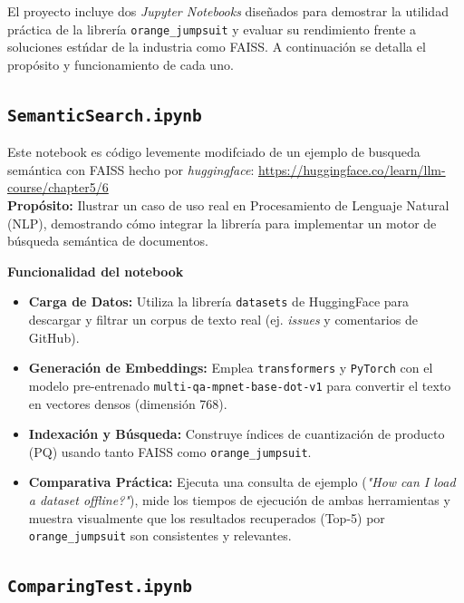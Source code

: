 El proyecto incluye dos \textit{Jupyter Notebooks} diseñados para demostrar 
la utilidad pr\'actica de la librer\'ia \texttt{orange\_jumpsuit} y evaluar
su rendimiento frente a soluciones est\'ndar de la industria como FAISS. 
A continuaci\'on se detalla el prop\'osito y funcionamiento de cada uno.

\subsection*{\texttt{SemanticSearch.ipynb}}

Este notebook es c\'odigo levemente modifciado de un ejemplo de busqueda 
sem\'antica con FAISS hecho por \textit{huggingface}:
\url{https://huggingface.co/learn/llm-course/chapter5/6} \\

\textbf{Prop\'osito:} 
Ilustrar un caso de uso real en Procesamiento de Lenguaje Natural (NLP),
demostrando c\'omo integrar la librer\'ia para implementar un motor de 
b\'usqueda sem\'antica de documentos.

\textbf{Funcionalidad del notebook}
\begin{itemize}
    \item \textbf{Carga de Datos:} 
      Utiliza la librer\'ia \texttt{datasets} de HuggingFace para descargar 
      y filtrar un corpus de texto real (ej. \textit{issues} y comentarios de
      GitHub).
    \item \textbf{Generaci\'on de Embeddings:} 
      Emplea \texttt{transformers} y \texttt{PyTorch} con el modelo
      pre-entrenado \texttt{multi-qa-mpnet-base-dot-v1} para convertir el
      texto en vectores densos (dimensi\'on 768).
    \item \textbf{Indexaci\'on y B\'usqueda:} 
      Construye \'indices de cuantizaci\'on de producto (PQ) usando tanto FAISS
      como \texttt{orange\_jumpsuit}.
    \item \textbf{Comparativa Pr\'actica:} 
      Ejecuta una consulta de ejemplo 
      (\textit{"How can I load a dataset offline?"}),
      mide los tiempos de ejecuci\'on de ambas herramientas y muestra
      visualmente que los resultados recuperados (Top-5) por
      \texttt{orange\_jumpsuit} son consistentes y relevantes.
\end{itemize}

\newpage 

\subsection*{\texttt{ComparingTest.ipynb}}

